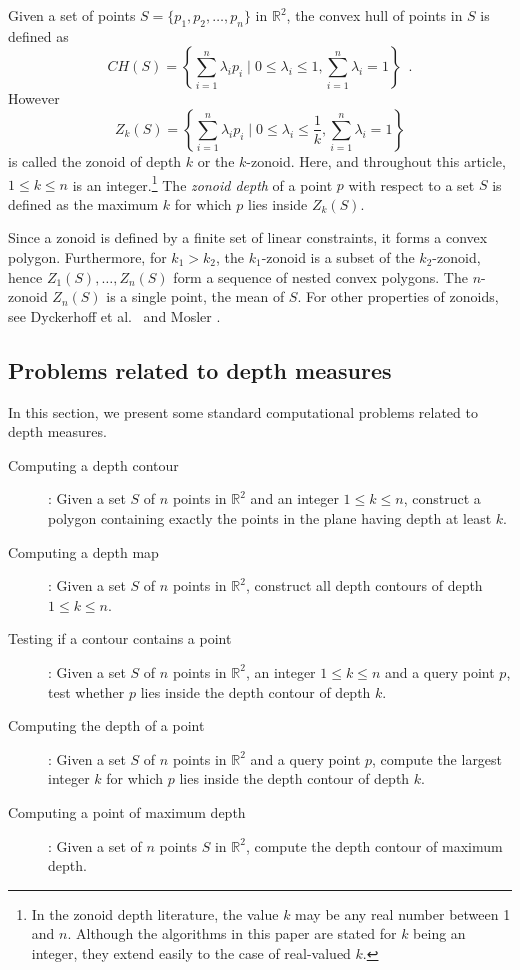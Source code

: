 \documentclass[charterfonts,lotsofwhite]{patmorin}
\begin{document}
Given a set of points $S = \{p_1, p_2,\ldots, p_n\}$ in
$\mathbb{R}^2$, the convex hull of points in $S$ is defined as 
\[
   CH(S) = \left\{\sum_{i=1}^{n} \lambda_ip_i \mid 0 \le \lambda_i \le 1,
             \sum_{i=1}^{n}{\lambda_i} = 1\right\} \enspace . 
\] 
However 
\[
   Z_k(S) = \left\{\sum_{i=1}^{n}\lambda_ip_i \mid 0 \le \lambda_i \le
             \frac{1}{k}, \sum_{i=1}^{n}{\lambda_i} = 1\right\}
\] 
is called the zonoid of depth $k$ or the $k$-zonoid. Here, and
throughout this article, $1 \le k \le n$ is an integer.\footnote{In
the zonoid depth literature, the value $k$ may be any real number
between 1 and $n$.   Although the algorithms in this paper are stated
for $k$ being an integer, they extend easily to the case of
real-valued $k$.}  The \emph{zonoid depth} of a point $p$ with respect
to a set $S$ is defined as the maximum $k$ for which $p$ lies inside
$Z_k(S)$.  

Since a zonoid is defined by a finite set of linear constraints, it
forms a convex polygon.  Furthermore, for $k_1 > k_2$, the
$k_1$-zonoid is a subset of the $k_2$-zonoid, hence
$Z_1(S),\ldots,Z_n(S)$ form a sequence of nested convex polygons.  The
$n$-zonoid $Z_n(S)$ is a single point, the mean of $S$. For other
properties of zonoids, see Dyckerhoff et al.\
\cite{zonoid_data_depth_theory_and_computation} and Mosler
\cite{mosler_book}. 

\subsection{Problems related to depth measures}
\label{subsection_problems_related_to_depth_measures}

In this section, we present some standard computational problems
related to depth measures. 

\begin{description}
\item [Computing a depth contour]: Given a set $S$ of $n$ points in
$\mathbb{R}^2$ and an integer $1 \le k \le n$, construct a polygon
containing exactly the points in the plane having depth at least $k$.

\item [Computing a depth map]: Given a set $S$ of $n$ points in
$\mathbb{R}^2$, construct all depth contours of depth $1 \le k \le n$.

\item [Testing if a contour contains a point]: Given a set $S$ of $n$
points in $\mathbb{R}^2$, an integer $1 \le k \le n$ and a query point
$p$, test whether $p$ lies inside the depth contour of depth $k$.

\item [Computing the depth of a point]: Given a set $S$ of $n$ points
in $\mathbb{R}^2$ and a query point $p$, compute the largest integer
$k$ for which $p$ lies inside the depth contour of depth $k$.

\item [Computing a point of maximum depth]: Given a set of $n$ points
$S$ in $\mathbb{R}^2$, compute the depth contour of maximum depth.
\end{description}
\end{document}
